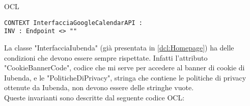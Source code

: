 \begin{listaPersonale}{OCL}
        \begin{lstlisting}
CONTEXT InterfacciaGoogleCalendarAPI :
INV : Endpoint <> ""
    \end{lstlisting}
        \newpage



        \begin{center}
            
        \end{center}
        La classe "InterfacciaIubenda" (già presentata in \ref{dcl:Homepage}) ha delle condizioni che devono essere sempre rispettate. Infatti l'attributo "CookieBannerCode", codice che mi serve per accedere al banner di cookie di Iubenda, e le "PoliticheDiPrivacy", stringa che contiene le politiche di privacy ottenute da Iubenda, non devono essere delle stringhe vuote.\\
        Queste invarianti sono descritte dal seguente codice OCL:


\end{listaPersonale}
